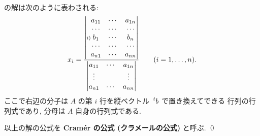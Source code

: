 \documentclass[12pt,twoside]{jarticle}
\begin{document}
\begin{question}
\begin{enumerate}
\begin{align*}
    \end{align*}
    の解は次のように表わされる:
    \begin{equation*}
      x_i = 
      \frac{
        \begin{vmatrix}
          \hphantom{\!\!\scriptstyle i)}\;a_{11} & \cdots & a_{1n} \\
          \hphantom{\!\!\scriptstyle i)}\;\cdots & \cdots & \cdots \\
                   {\!\!\scriptstyle i)}\;b_1    & \cdots & b_n    \\
          \hphantom{\!\!\scriptstyle i)}\;\cdots & \cdots & \cdots \\
          \hphantom{\!\!\scriptstyle i)}\;a_{n1} & \cdots & a_{nn} \\
        \end{vmatrix}
        }{
        \begin{vmatrix}
          a_{11} & \cdots & a_{1n} \\
          \vdots &        & \vdots \\
          a_{n1} & \cdots & a_{nn} \\
        \end{vmatrix}
        }
      \qquad (i=1,\ldots,n).
    \end{equation*}
    ここで右辺の分子は $A$ の第 $i$ 行を縦ベクトル $\tp{b}$ で置き換えてできる
    行列の行列式であり, 分母は $A$ 自身の行列式である.
  \end{enumerate}
  以上の解の公式を {\bf Cram\'er の公式 (クラメールの公式)} と呼ぶ.
  \qed
\end{question}
\end{document}
